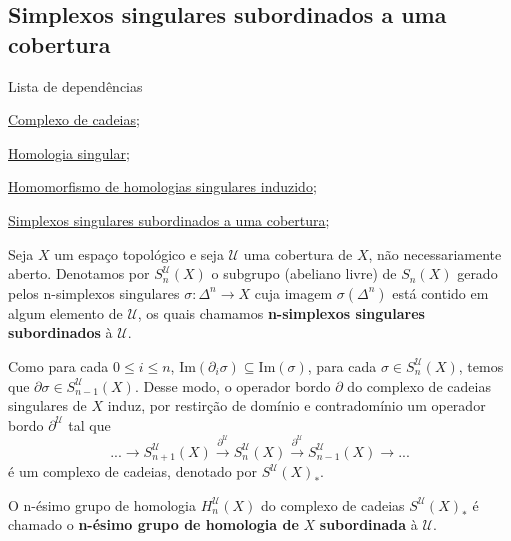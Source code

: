 \subsection{Simplexos singulares subordinados a uma cobertura} %
\label{simplexos-singulares-subordinados-a-uma-cobertura-def}
\begin{titlemize}{Lista de dependências}
	\item \hyperref[complexo-de-cadeias-def]{Complexo de cadeias};\\ 
    \item \hyperref[homologia-singular-def]{Homologia singular};\\
    \item \hyperref[homomorfismo-de-homologias-singulares-induzido-prop]{Homomorfismo de homologias singulares induzido};\\
    \item \hyperref[simplexos-singulares-subordinados-a-uma-cobertura-def]{Simplexos singulares subordinados a uma cobertura};\\
    
\end{titlemize}

\begin{defi}
    Seja $X$ um espaço topológico e seja $\mathcal{U}$ uma cobertura de $X$, não necessariamente aberto. Denotamos por $S^{\mathcal{U}}_n (X)$ o subgrupo (abeliano livre) de $S_n (X)$ gerado pelos n-simplexos singulares $\sigma:\Delta^n\rightarrow X$ cuja imagem $\sigma(\Delta^n)$ está contido em algum elemento de $\mathcal{U}$, os quais chamamos \textbf{n-simplexos singulares subordinados} à $\mathcal{U}$.
\end{defi}
    Como para cada $0\le i\le n$, $\text{Im}(\partial_i \sigma )\subseteq \text{Im}(\sigma)$, para cada $\sigma\in S_n^{\mathcal{U}}(X)$, temos que $\partial\sigma\in S^{\mathcal{U}}_{n-1}(X)$. Desse modo, o operador bordo $\partial$ do complexo de cadeias singulares de $X$ induz, por restirção de domínio e contradomínio um operador bordo $\partial^{\mathcal{U}}$ tal que 
    \[...\rightarrow S^{\mathcal{U}}_{n+1}(X)\xrightarrow{\partial^{\mathcal{U}}}S_n^{\mathcal{U}}(X)\xrightarrow{\partial^{\mathcal{U}}}S_{n-1}^{\mathcal{U}} (X)\rightarrow...\]
    é um complexo de cadeias, denotado por $S^{\mathcal{U}}(X)_*$.

\begin{defi}
O n-ésimo grupo de homologia $H_n^{\mathcal{U}}(X)$ do complexo de cadeias $S^{\mathcal{U}}(X)_*$ é chamado o \textbf{n-ésimo grupo de homologia de} $X$ \textbf{subordinada} à $\mathcal{U}$.
\end{defi}

